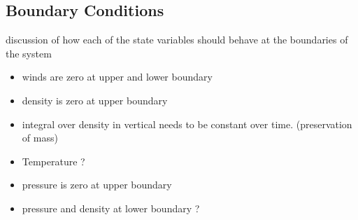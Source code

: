 \subsection{Boundary Conditions}
discussion of how each of the state variables should behave at the boundaries of the system
\begin{itemize}
\item winds are zero at upper and lower boundary
\item density is zero at upper boundary
\item integral over density in vertical needs to be constant over time. (preservation of mass)
\item Temperature ?
\item pressure is zero at upper boundary
\item pressure and density at lower boundary ?
\end{itemize}

